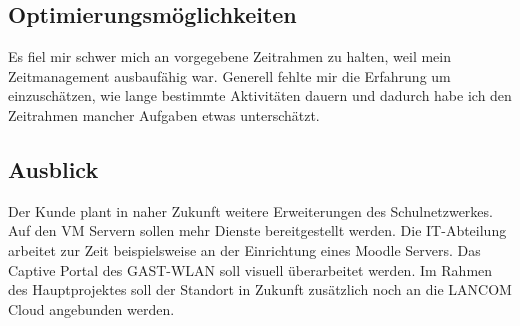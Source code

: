 \subsection{Optimierungsmöglichkeiten}
\label{sec:Optimierungsmöglichkeiten}
Es fiel mir schwer mich an vorgegebene Zeitrahmen zu halten, weil mein Zeitmanagement ausbaufähig war. Generell fehlte mir die Erfahrung um einzuschätzen, wie lange bestimmte Aktivitäten dauern und dadurch habe ich den Zeitrahmen mancher Aufgaben etwas unterschätzt.


\subsection{Ausblick}
\label{sec:Ausblick}
Der Kunde plant in naher Zukunft weitere Erweiterungen des Schulnetzwerkes. Auf den VM Servern sollen mehr Dienste bereitgestellt werden. Die IT-Abteilung arbeitet zur Zeit beispielsweise an der Einrichtung eines Moodle Servers. Das Captive Portal des GAST-WLAN soll visuell überarbeitet werden. Im Rahmen des Hauptprojektes soll der Standort in Zukunft zusätzlich noch an die LANCOM Cloud angebunden werden. 
\begin{comment}
	\item Wie wird sich das Projekt in Zukunft weiterentwickeln (\zB geplante Erweiterungen)?
\end{comment}
